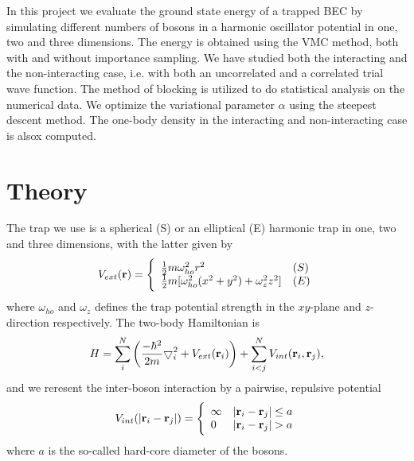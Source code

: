 \documentclass[english, a4paper]{article}
\begin{document}
\noindent In this project we evaluate the ground state energy of a trapped BEC by simulating different numbers of bosons
in a harmonic oscillator potential in one, two and three dimensions. The energy is obtained using the VMC method, both with 
and without importance sampling. We have studied both the interacting and the non-interacting case, i.e. with both 
an uncorrelated and a correlated trial wave function. The method of blocking is utilized to do statistical analysis on
the numerical data. We optimize the variational parameter $\alpha$ using the steepest descent method. The one-body 
density in the interacting and non-interacting case is alsox computed. 


\section{Theory}
The trap we use is a spherical (S) or an elliptical (E) harmonic trap in one, two and three dimensions, with the latter given by
\begin{equation}
 V_{ext}({\bf r}) = 
 \Bigg\{
\begin{array}{ll}
	 \frac{1}{2}m\omega_{ho}^2r^2 & (S)\\
 \strut
	 \frac{1}{2}m[\omega_{ho}^2(x^2+y^2) + \omega_z^2z^2] & (E)
 \label{trap_eqn}
\end{array}
\end{equation}
where $\omega_{ho}$ and $\omega_z$ defines the trap potential strength in the $xy$-plane and $z$-direction respectively.
The two-body Hamiltonian is
 \begin{equation}
     H = \sum_i^N \left(
	 \frac{-\hbar^2}{2m}
	 { \bigtriangledown }_{i}^2 +
	 V_{ext}({\bf{r}}_i)\right)  +
	 \sum_{i<j}^{N} V_{int}({\bf{r}}_i,{\bf{r}}_j),
 \end{equation}
 and we reresent the inter-boson interaction by a pairwise, repulsive potential
 \begin{equation}
 V_{int}(|{\bf r}_i-{\bf r}_j|) =  \Bigg\{
 \begin{array}{ll}
	 \infty & {|{\bf r}_i-{\bf r}_j|} \leq {a}\\
	 0 & {|{\bf r}_i-{\bf r}_j|} > {a}
 \end{array}
 \end{equation}
 where ${a}$ is the so-called hard-core diameter of the bosons.
 
\end{document}
